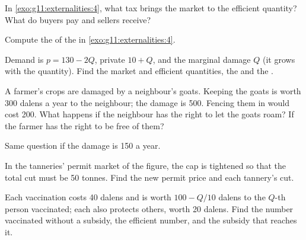 \begin{exercise}[$\star$]\label{exo:g11:externalities:5}
In \cref{exo:g11:externalities:4}, what tax brings the market to the efficient quantity? What do buyers pay and sellers receive?
\end{exercise}

\begin{exercise}[$\star\star$]\label{exo:g11:externalities:6}
Compute the  of the  in \cref{exo:g11:externalities:4}.
\end{exercise}

\begin{exercise}[$\star\star$]\label{exo:g11:externalities:7}
Demand is $p = 130 - 2Q$, private  $10 + Q$, and the marginal damage $Q$ (it grows with the quantity). Find the market and efficient quantities, the
 and the .
\end{exercise}

\begin{exercise}[$\star\star$]\label{exo:g11:externalities:8}
A farmer's crops are damaged by a neighbour's goats. Keeping the goats is worth 300 dalens a year to the neighbour; the damage is 500. Fencing them in would cost 200.
What happens if the neighbour has the right to let the goats roam? If the farmer has the right to be free of them?
\end{exercise}

\begin{exercise}[$\star\star$]\label{exo:g11:externalities:9}
Same question if the damage is 150 a year.
\end{exercise}

\begin{exercise}[$\star\star$]\label{exo:g11:externalities:10}
In the tanneries' permit market of the figure, the cap is tightened so that the total cut must be 50 tonnes. Find the new permit price and each tannery's cut.
\end{exercise}

\begin{exercise}[$\star\star$]\label{exo:g11:externalities:11}
Each vaccination costs 40 dalens and is worth $100 - Q/10$ dalens to the $Q$-th person vaccinated; each also protects others, worth 20 dalens. Find the number
vaccinated without a subsidy, the efficient number, and the subsidy that reaches it.
\end{exercise}

